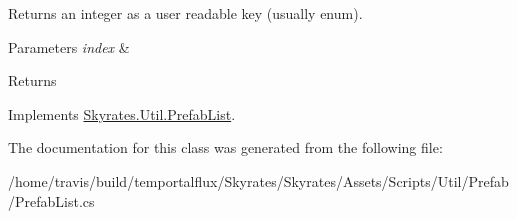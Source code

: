 Returns an integer as a user readable key (usually enum). 


\begin{DoxyParams}{Parameters}
{\em index} & \\
\hline
\end{DoxyParams}
\begin{DoxyReturn}{Returns}

\end{DoxyReturn}


Implements \hyperlink{class_skyrates_1_1_util_1_1_prefab_list_a5fc66fb12f8cb7148a783229e742ba72}{Skyrates.\-Util.\-Prefab\-List}.



The documentation for this class was generated from the following file\-:\begin{DoxyCompactItemize}
\item 
/home/travis/build/temportalflux/\-Skyrates/\-Skyrates/\-Assets/\-Scripts/\-Util/\-Prefab/Prefab\-List.\-cs\end{DoxyCompactItemize}
